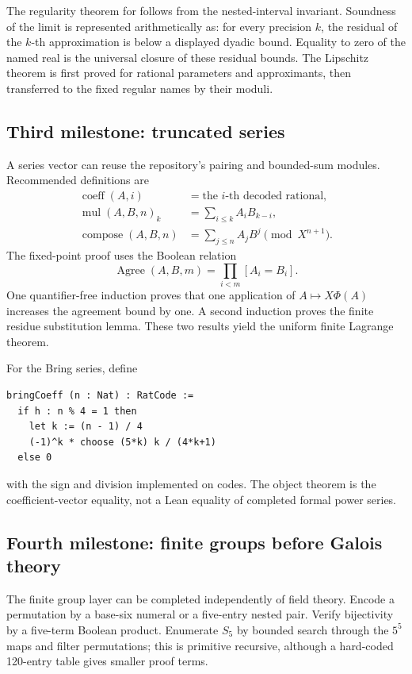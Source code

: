 The regularity theorem for  follows from the nested-interval
invariant.  Soundness of the limit is represented arithmetically as:
for every precision \(k\), the residual of the \(k\)-th approximation is below
a displayed dyadic bound.  Equality to zero of the named real is the universal
closure of these residual bounds.  The Lipschitz theorem is first proved for
rational parameters and approximants, then transferred to the fixed regular
names by their moduli.

\subsection{Third milestone: truncated series}

A series vector can reuse the repository's pairing and bounded-sum modules.
Recommended definitions are
\begin{align*}
 \operatorname{coeff}(A,i)&=\text{the }i\text{-th decoded rational},\\
 \operatorname{mul}(A,B,n)_k
 &=\sum_{i\le k}A_iB_{k-i},\\
 \operatorname{compose}(A,B,n)
 &=\sum_{j\le n}A_jB^j\pmod{X^{n+1}}.
\end{align*}
The fixed-point proof uses the Boolean relation
\[
 \operatorname{Agree}(A,B,m)
 =\prod_{i<m}[A_i=B_i].
\]
One quantifier-free induction proves that one application of
\(A\mapsto X\Phi(A)\) increases the agreement bound by one.  A second induction
proves the finite residue substitution lemma.  These two results yield the
uniform finite Lagrange theorem.

For the Bring series, define
\begin{lstlisting}[style=code,language={}]
bringCoeff (n : Nat) : RatCode :=
  if h : n % 4 = 1 then
    let k := (n - 1) / 4
    (-1)^k * choose (5*k) k / (4*k+1)
  else 0
\end{lstlisting}
with the sign and division implemented on codes.  The object theorem is the
coefficient-vector equality, not a Lean equality of completed formal power
series.

\subsection{Fourth milestone: finite groups before Galois theory}

The finite group layer can be completed independently of field theory.  Encode
a permutation by a base-six numeral or a five-entry nested pair.  Verify
bijectivity by a five-term Boolean product.  Enumerate \(S_5\) by bounded search
through the \(5^5\) maps and filter permutations; this is primitive recursive,
although a hard-coded 120-entry table gives smaller proof terms.


